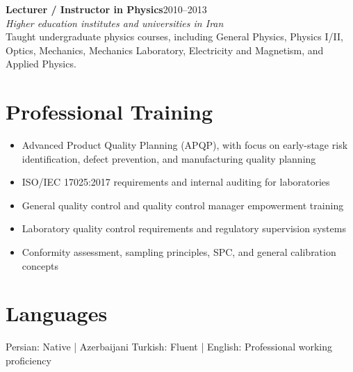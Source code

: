 \documentclass[11pt,a4paper]{article}
\newcommand{\entry}[4]{%
  \textbf{#1}\hfill {\color{light}#2}\\
  \textit{#3}\\[-1pt]
  #4\vspace{3pt}
}
\begin{document}
\entry{Lecturer / Instructor in Physics}{2010--2013}
{Higher education institutes and universities in Iran}
{
Taught undergraduate physics courses, including General Physics, Physics I/II, Optics, Mechanics, Mechanics Laboratory, Electricity and Magnetism, and Applied Physics.
}

\section*{Professional Training}
\begin{itemize}
  \item Advanced Product Quality Planning (APQP), with focus on early-stage risk identification, defect prevention, and manufacturing quality planning
  \item ISO/IEC 17025:2017 requirements and internal auditing for laboratories
  \item General quality control and quality control manager empowerment training
  \item Laboratory quality control requirements and regulatory supervision systems
  \item Conformity assessment, sampling principles, SPC, and general calibration concepts
\end{itemize}

\section*{Languages}
Persian: Native \quad | \quad Azerbaijani Turkish: Fluent \quad | \quad English: Professional working proficiency
\end{document}

